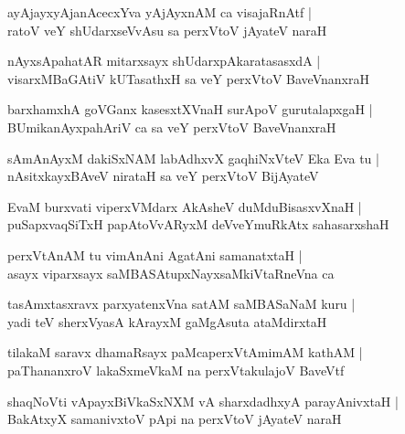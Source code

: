 \begin{shloka}
ayAjayxyAjanAcecxYva yAjAyxnAM ca visajaRnAtf |\\
ratoV veY shUdarxseVvAsu sa perxVtoV jAyateV naraH
\end{shloka}

\begin{shloka}
nAyxsApahatAR mitarxsayx shUdarxpAkaratasasxdA |\\ visarxMBaGAtiV kUTasathxH sa veY perxVtoV BaveVnanxraH
\end{shloka}

\begin{shloka}
barxhamxhA goVGanx kasesxtXVnaH surApoV gurutalapxgaH |\\
BUmikanAyxpahAriV ca sa veY perxVtoV BaveVnanxraH
\end{shloka}

\begin{shloka}
sAmAnAyxM dakiSxNAM labAdhxvX gaqhiNxVteV Eka Eva tu |\\
nAsitxkayxBAveV nirataH sa veY perxVtoV BijAyateV 
\end{shloka}

\begin{shloka}
EvaM burxvati viperxVMdarx AkAsheV duMduBisasxvXnaH |\\
puSapxvaqSiTxH papAtoVvARyxM deVveYmuRkAtx sahasarxshaH
\end{shloka}

\begin{shloka}
perxVtAnAM tu vimAnAni AgatAni samanatxtaH |\\
asayx viparxsayx saMBASAtupxNayxsaMkiVtaRneVna ca 
\end{shloka}

\begin{shloka}
tasAmxtasxravx parxyatenxVna satAM saMBASaNaM kuru |\\
yadi teV sherxVyasA kArayxM gaMgAsuta ataMdirxtaH
\end{shloka}

\begin{shloka}
tilakaM saravx dhamaRsayx paMcaperxVtAmimAM kathAM |\\
paThananxroV lakaSxmeVkaM na perxVtakulajoV BaveVtf
\end{shloka}

\begin{shloka}
shaqNoVti vApayxBiVkaSxNXM vA sharxdadhxyA parayAnivxtaH |\\
BakAtxyX samanivxtoV pApi na perxVtoV jAyateV naraH 
\end{shloka}

